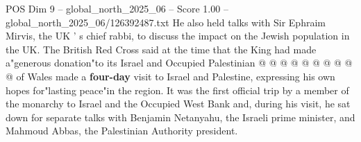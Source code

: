 \begin{textsample}{POS Dim 9 – global\_north\_2025\_06 – Score 1.00 – global\_north\_2025\_06/126392487.txt}
He also held talks with Sir Ephraim Mirvis, the UK ' s chief rabbi, to discuss the impact on the Jewish population in the UK.
The British Red Cross said at the time that the King had made a"generous donation"to its Israel and Occupied Palestinian @ @ @ @ @ @ @ @ @ @ of Wales made a \textbf{four-day} visit to Israel and Palestine, expressing his own hopes for"lasting peace"in the region.
It was the first official trip by a member of the monarchy to Israel and the Occupied West Bank and, during his visit, he sat down for separate talks with Benjamin Netanyahu, the Israeli prime minister, and Mahmoud Abbas, the Palestinian Authority president.

\end{textsample}
